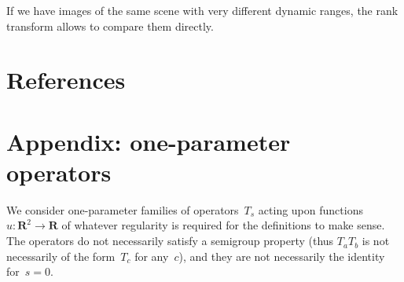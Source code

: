 \documentclass[12pt]{article}                  %
\begin{document}
If we have images of the same scene with very different dynamic ranges, the
rank transform allows to compare them directly.   


\section{References}






\clearpage

\section*{Appendix: one-parameter operators}

We consider one-parameter families of operators~$T_s$ acting upon
functions~$u:\mathbf{R}^2\to\mathbf{R}$ of whatever regularity is required
for the definitions to make sense.  The operators do not necessarily satisfy
a semigroup property (thus $T_aT_b$ is not necessarily of the form~$T_c$ for
any~$c$), and they are not necessarily the identity for~$s=0$.
\end{document}
